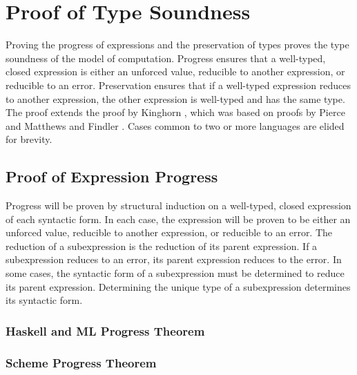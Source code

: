 \chapter{Proof of Type Soundness}


Proving the progress of expressions and the preservation of types proves the type soundness of the model of computation.  Progress ensures that a well-typed, closed expression is either an unforced value, reducible to another expression, or reducible to an error.  Preservation ensures that if a well-typed expression reduces to another expression, the other expression is well-typed and has the same type.  The proof extends the proof by Kinghorn \cite{kinghorn07}, which was based on proofs by Pierce \cite{pierce02} and Matthews and Findler \cite{matthews07}.  Cases common to two or more languages are elided for brevity.

\section{Proof of Expression Progress}

Progress will be proven by structural induction on a well-typed, closed expression of each syntactic form.  In each case, the expression will be proven to be either an unforced value, reducible to another expression, or reducible to an error.  The reduction of a subexpression is the reduction of its parent expression.  If a subexpression reduces to an error, its parent expression reduces to the error.  In some cases, the syntactic form of a subexpression must be determined to reduce its parent expression.  Determining the unique type of a subexpression determines its syntactic form.







\subsection{Haskell and ML Progress Theorem}



\subsection{Scheme Progress Theorem}

